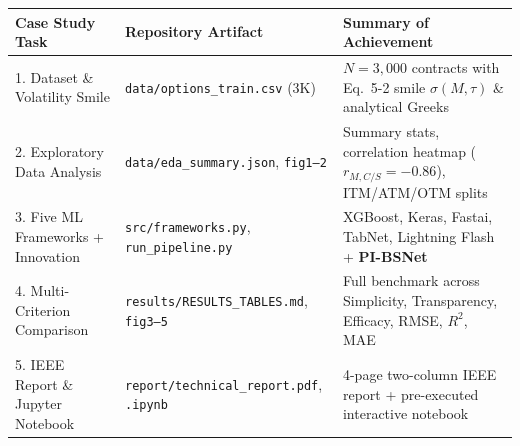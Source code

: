\documentclass[11pt]{article}
\begin{document}
{\renewcommand{\arraystretch}{1.01}
\scriptsize
\begin{tabular}{@{}p{3.9cm}p{4.3cm}p{5.2cm}@{}}
\toprule
\textbf{Case Study Task} & \textbf{Repository Artifact} & \textbf{Summary of Achievement} \\
\midrule
1. Dataset \& Volatility Smile & \texttt{data/options\_train.csv} (3K) & $N=3,000$ contracts with Eq.\ 5-2 smile $\sigma(M,\tau)$ \& analytical Greeks \\
2. Exploratory Data Analysis & \texttt{data/eda\_summary.json}, \texttt{fig1--2} & Summary stats, correlation heatmap ($r_{M,C/S}=-0.86$), ITM/ATM/OTM splits \\
3. Five ML Frameworks + Innovation & \texttt{src/frameworks.py}, \texttt{run\_pipeline.py} & XGBoost, Keras, Fastai, TabNet, Lightning Flash + \textbf{PI-BSNet} \\
4. Multi-Criterion Comparison & \texttt{results/RESULTS\_TABLES.md}, \texttt{fig3--5} & Full benchmark across Simplicity, Transparency, Efficacy, RMSE, $R^2$, MAE \\
5. IEEE Report \& Jupyter Notebook & \texttt{report/technical\_report.pdf}, \texttt{.ipynb} & 4-page two-column IEEE report + pre-executed interactive notebook \\
\bottomrule
\end{tabular}\par}

\vspace{0.05cm}
\end{document}
